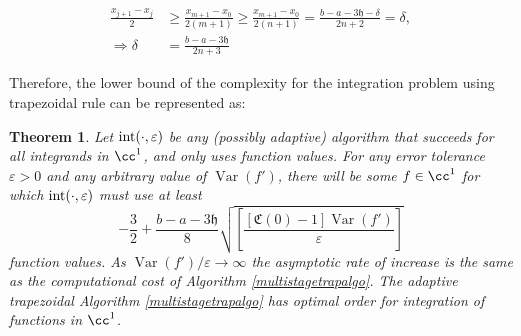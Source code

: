 \documentclass{iitthesis}
\DeclareMathOperator{\Var}{Var}
\newtheorem{theorem}{Theorem}
\theoremstyle{definition}
\theoremstyle{remark}
\begin{document}
  \begin{align*}
    \frac{x_{j+1}-x_{j}}{2}&\ge\frac{x_{m+1}-x_{0}}{2(m+1)}\ge\frac{x_{m+1}-x_{0}}{2(n+1)}=\frac{b-a-3\mathfrak{h}-\delta}{2n+2}=\delta,\\
    \Rightarrow \delta&=\frac{b-a-3\mathfrak{h}}{2n+3}
  \end{align*}

Therefore, the lower bound of the complexity for the integration problem using trapezoidal rule can be represented as:
\begin{theorem} \label{comptrap}
Let $\textup{int}(\cdot,\varepsilon)$ be any (possibly adaptive) algorithm that succeeds for all integrands in $\cc^1$, and only uses function values. For any error tolerance $\varepsilon > 0$ and any arbitrary value of $\Var(f')$, there will be some $f\in \cc^1$ for which $\textup{int}(\cdot,\varepsilon)$ must use at least
    \begin{equation}\label{complowbdtrap}
        -\frac{3}{2}+\frac{b-a-3\mathfrak{h}}{8}\sqrt{\left[\frac{[\mathfrak{C}(0)-1]\Var( f')}{\varepsilon}\right]}
    \end{equation}
    function values. As $\Var(f')/\varepsilon \rightarrow \infty$ the asymptotic rate of increase is the same as the computational cost of Algorithm \ref{multistagetrapalgo}. The adaptive trapezoidal Algorithm \ref{multistagetrapalgo} has optimal order for integration of functions in $\cc^1$.
\end{theorem}
\end{document}
